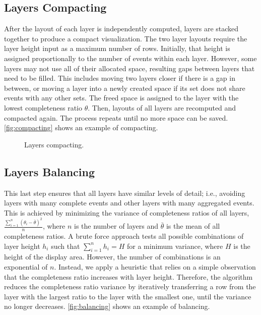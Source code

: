 \subsection{Layers Compacting}
\label{sub:compact}
After the layout of each layer is independently computed, layers are stacked together to produce a compact visualization. The two layer layouts require the layer height input as a maximum number of rows. Initially, that height is assigned proportionally to the number of events within each layer. However, some layers may not use all of their allocated space, resulting gaps between layers that need to be filled. This includes moving two layers closer if there is a gap in between, or moving a layer into a newly created space if its set does not share events with any other sets. The freed space is assigned to the layer with the lowest completeness ratio $\theta$. Then, layouts of all layers are recomputed and compacted again. The process repeats until no more space can be saved. \autoref{fig:compacting} shows an example of compacting.

\begin{figure}[!htb]
	\centering
	\hfill
	\caption{Layers compacting.}
	\label{fig:compacting}
\end{figure}

\subsection{Layers Balancing}
This last step ensures that all layers have similar levels of detail; i.e., avoiding layers with many complete events and other layers with many aggregated events. This is achieved by minimizing the variance of completeness ratios of all layers,
$\frac{\sum\limits_{i=1}^{n}(\theta_i - \bar{\theta})^2} {n}$, where $n$ is the number of layers and $\bar{\theta}$ is the mean of all completeness ratios. A brute force approach tests all possible combinations of layer height $h_i$ such that $\sum\limits_{i=1}^{n}h_i=H$ for a minimum variance, where $H$ is the height of the display area. However, the number of combinations is an exponential of $n$. Instead, we apply a heuristic that relies on a simple observation that the completeness ratio increases with layer height. Therefore, the algorithm reduces the completeness ratio variance by iteratively transferring a row from the layer with the largest ratio to the layer with the smallest one, until the variance no longer decreases. \autoref{fig:balancing} shows an example of balancing.

